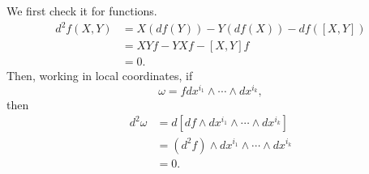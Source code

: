 \documentclass{ximera}
\begin{document}
\begin{solution}
We first check it for functions. 
\begin{align*}
    d^2 f (X,Y) & = X (df (Y)  )  - Y (df (X)) - df ([X,Y]) \\
    & = X Yf - YXf - [X,Y] f \\
    & = 0 . 
\end{align*}
Then, working in local coordinates, if
\[     \omega = f dx^{i_1} \wedge \cdots \wedge dx ^{i_k}  ,             \]
then
\begin{align*}
    d^2 \omega & = d\left[  df \wedge  dx^{i_1} \wedge \cdots \wedge dx ^{i_k}  \right] \\
    & = ( d^2 f ) \wedge  dx^{i_1} \wedge \cdots \wedge dx ^{i_k}  \\
    & = 0 . 
\end{align*}
\end{solution}
\end{document}
